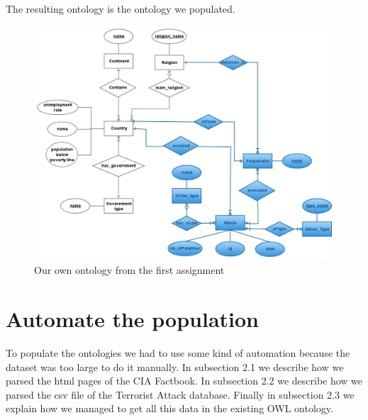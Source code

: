 \documentclass{article}
\begin{document}
The resulting ontology is the ontology we populated.
\begin{figure}
\includegraphics[width=1\textwidth]{TerroristAttacks.jpg}
\caption{Our own ontology from the first assignment}
\label{fig:ontology}
\end{figure}
\section{Automate the population}
To populate the ontologies we had to use some kind of automation because the dataset was too large to do it manually. In subsection 2.1 we describe how we parsed the html pages of the CIA Factbook. In subsection 2.2 we describe how we parsed the csv file of the Terrorist Attack database. Finally in subsection 2.3 we explain how we managed to get all this data in the existing OWL ontology.
\end{document}
